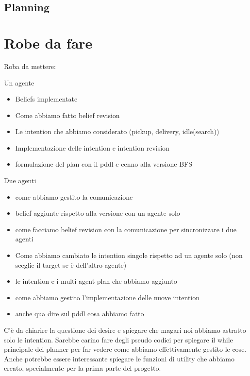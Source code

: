 \documentclass[a4paper, 11pt]{article}
\begin{document}
\subsection{Planning}






\pagebreak

\section{Robe da fare}

Roba da mettere:

Un agente
\begin{itemize}
\item Beliefs implementate
\item Come abbiamo fatto belief revision
\item Le intention che abbiamo considerato (pickup, delivery, idle(search))
\item Implementazione delle intention e intention revision
\item formulazione del plan con il pddl e cenno alla versione BFS
\end{itemize}

Due agenti
\begin{itemize}
\item come abbiamo gestito la comunicazione
\item belief aggiunte rispetto alla versione con un agente solo
\item come facciamo belief revision con la comunicazione per sincronizzare i due agenti
\item Come abbiamo cambiato le intention singole rispetto ad un agente solo (non sceglie il target se è dell'altro agente)
\item le intention e i multi-agent plan che abbiamo aggiunto
\item come abbiamo gestito l'implementazione delle nuove intention
\item anche qua dire sul pddl cosa abbiamo fatto
\end{itemize}

C'è da chiarire la questione dei desire e spiegare che magari noi abbiamo astratto solo le intention. Sarebbe carino fare degli pseudo codici per spiegare il while principale del planner per far vedere come abbiamo effettivamente gestito le cose. Anche potrebbe essere interessante spiegare le funzioni di utility che abbiamo creato, specialmente per la prima parte del progetto.





\pagebreak


\end{document}
